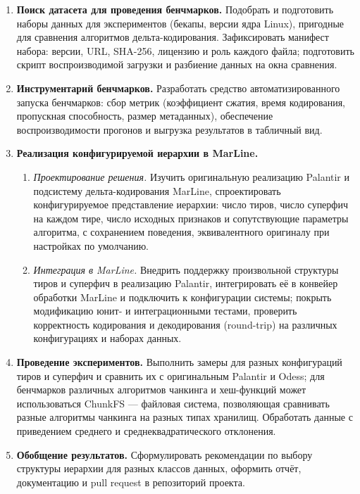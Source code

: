 \documentclass[a4paper]{article}
\begin{document}
\begin{enumerate}
    \item \textbf{Поиск датасета для проведения бенчмарков.} Подобрать и подготовить наборы данных для экспериментов (бекапы, версии ядра Linux), пригодные для сравнения алгоритмов дельта-кодирования. Зафиксировать манифест набора: версии, URL, SHA-256, лицензию и роль каждого файла; подготовить скрипт воспроизводимой загрузки и разбиение данных на окна сравнения.
    \item \textbf{Инструментарий бенчмарков.} Разработать средство автоматизированного запуска бенчмарков: сбор метрик (коэффициент сжатия, время кодирования, пропускная способность, размер метаданных), обеспечение воспроизводимости прогонов и выгрузка результатов в табличный вид.
    \item \textbf{Реализация конфигурируемой иерархии в MarLine.}
    \begin{enumerate}
        \item \textit{Проектирование решения.} Изучить оригинальную реализацию Palantir и подсистему дельта-кодирования MarLine, спроектировать конфигурируемое представление иерархии: число тиров, число суперфич на каждом тире, число исходных признаков и сопутствующие параметры алгоритма, с сохранением поведения, эквивалентного оригиналу при настройках по умолчанию.
        \item \textit{Интеграция в MarLine.} Внедрить поддержку произвольной структуры тиров и суперфич в реализацию Palantir, интегрировать её в конвейер обработки MarLine и подключить к конфигурации системы; покрыть модификацию юнит- и интеграционными тестами, проверить корректность кодирования и декодирования (round-trip) на различных конфигурациях и наборах данных.
    \end{enumerate}
    \item \textbf{Проведение экспериментов.} Выполнить замеры для разных конфигураций тиров и суперфич и сравнить их с оригинальным Palantir и Odess; для бенчмарков различных алгоритмов чанкинга и хеш-функций может использоваться ChunkFS --- файловая система, позволяющая сравнивать разные алгоритмы чанкинга на разных типах хранилищ. Обработать данные с приведением среднего и среднеквадратического отклонения.
    \item \textbf{Обобщение результатов.} Сформулировать рекомендации по выбору структуры иерархии для разных классов данных, оформить отчёт, документацию и pull request в репозиторий проекта.
\end{enumerate}
\end{document}
